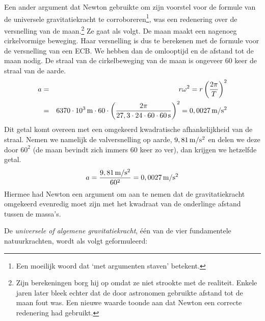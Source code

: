 Een ander argument dat Newton gebruikte om zijn voorstel voor de formule van de universele gravitatiekracht te corroboreren\footnote{Een moeilijk woord dat `met argumenten staven' betekent.}, was een redenering over de versnelling van de maan.\footnote{Zijn berekeningen borg hij op omdat ze niet strookte met de realiteit. Enkele jaren later bleek echter dat de door astronomen gebruikte afstand tot de maan fout was. Een nieuwe waarde toonde aan dat Newton een correcte redenering had gebruikt.} Ze gaat als volgt. De maan maakt een nagenoeg cirkelvormige beweging. Haar versnelling is dus te berekenen met de formule voor de versnelling van een ECB. We hebben dan de omlooptijd en de afstand tot de maan nodig. De straal van de cirkelbeweging van de maan is ongeveer 60 keer de straal van de aarde.
\begin{eqnarray*}
	a&=&r\omega^2=r\left(\frac{2\pi}{T}\right)^2\\
	&=&6370\cdot10^3\rm\,m\cdot60\cdot\left(\frac{2\pi}{27,3\cdot24\cdot60\cdot60\rm\,s}\right)^2=0,0027\rm\,m/s^2
\end{eqnarray*}
Dit getal komt overeen met een omgekeerd kwadratische afhankelijkheid van de straal. Nemen we namelijk de valversnelling op aarde, $9,81\rm\,m/s^2$ en delen we deze door $60^2$ (de maan bevindt zich immers 60 keer zo ver), dan krijgen we hetzelfde getal.
\begin{eqnarray*}
	a=\frac{9,81\rm\,m/s^2}{60^2}=0,0027\rm\,m/s^2
\end{eqnarray*}
Hiermee had Newton een argument om aan te nemen dat de gravitatiekracht omgekeerd evenredig moet zijn met het kwadraat van de onderlinge afstand tussen de massa's.

De \textit{universele of algemene gravitatiekracht}, \'e\'en van de vier fundamentele natuurkrachten, wordt als volgt geformuleerd:
\begin{center}
\end{center}

